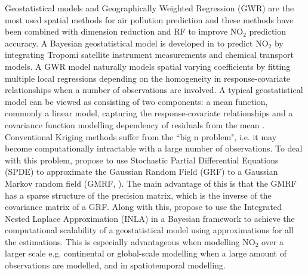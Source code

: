 \documentclass{article}
\begin{document}
Geostatistical models and Geographically Weighted Regression (GWR) are the most used spatial methods for air pollution prediction \citep{vicedo2013bayesian,li2014estimating,wang2021impacts,zou2016high} and these methods have been combined with dimension reduction \cite{zhai2018improved} and RF \citep{zhan2018satellite,liu2020integrate} to improve NO$_2$ prediction accuracy. A Bayesian geostatistical model is developed in \cite{BELOCONI2020105578} to predict NO$_2$ by integrating Tropomi satellite instrument measurements and chemical transport models. A GWR model naturally models spatial varying coefficients by fitting multiple local regressions depending on the homogeneity in response-covariate relationships when a number of observations are involved. A typical geostatistical model can be viewed as consisting of two components: a mean function, commonly a linear model, capturing the response-covariate relationships and a covariance function modelling dependency of residuals from the mean \citep{stackinla}. Conventional Kriging methods suffer from the ``big n problem", i.e. it may become computationally intractable with a large number of observations. To deal with this problem, \cite{lindgren2011explicit} propose to use Stochastic Partial Differential Equations (SPDE) to approximate the Gaussian Random Field (GRF) to a Gaussian Markov random field (GMRF, \cite{rue2005gaussian}). The main advantage of this is that the GMRF has a sparse structure of the precision matrix, which is the inverse of the covariance matrix of a GRF. Along with this, \cite{rue2009approximate} propose to use the Integrated Nested Laplace Approximation (INLA) in a Bayesian framework to achieve the computational scalability of a geostatistical model using approximations for all the estimations. This is especially advantageous when  modelling NO$_2$ over a larger scale e.g. continental or global-scale modelling when a large amount of observations are modelled, and in spatiotemporal modelling. 




\end{document}
